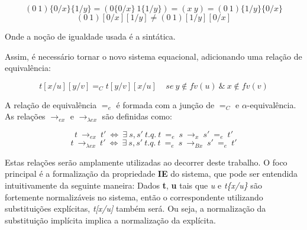 \[ (0\ 1) \{0/x\}\{1/y\} = (0\{0/x\}\ 1\{1/y\}) = (x\ y) =  (0\ 1) \{1/y\}\{0/x\} \]
\[ (0\ 1) [0/x][1/y] \neq  (0\ 1) [1/y][0/x] \]

Onde a noção de igualdade usada é a sintática.

Assim, é necessário tornar o novo sistema
equacional, adicionando uma relação de equivalência:

\[ t[x/u][y/v] =_C t[y/v][x/u] \ \ \ \ \ se\ y \notin fv(u)\ \&\ x \notin fv(v)\] 

A relação de equivalência $=_e$ é formada com a junção de $=_C$ e
$\alpha$-equivalência. As relações $\rightarrow_{ex}$ e $\rightarrow_{\lambda
    ex}$ são definidas como:

\[t\ \rightarrow_{ex}\ t'\ \iff\ \exists\ s,s'\ t.q.\ t\ =_{e}\ s\
    \rightarrow_x\ s'\ =_e\ t' \]
\[t\ \rightarrow_{\lambda ex}\ t'\ \iff\ \exists\ s,s'\ t.q.\ t\ =_{e}\ s\
    \rightarrow_{Bx}\ s'\ =_e\ t' \]

Estas relações serão amplamente utilizadas ao decorrer deste trabalho. 
O foco principal é a formalização da propriedade \textbf{IE} do sistema, que
pode ser entendida intuitivamente da seguinte maneira: Dados \textbf{t},
\textbf{u} tais que \emph{u} e \emph{t\{x/u\}} são fortemente normalizáveis
no sistema, então o correspondente utilizando substituições explícitas,
\emph{t[x/u]} também será. Ou seja, a normalização da substituição implícita
implica a normalização da explícita.


